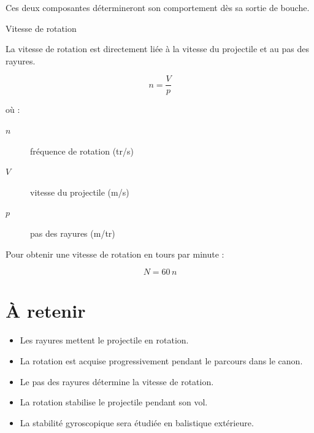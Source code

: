 Ces deux composantes détermineront son comportement dès sa sortie de bouche.

\begin{formule}{Vitesse de rotation}

La vitesse de rotation est directement liée à la vitesse du projectile et au
pas des rayures.

\[
n=\frac{V}{p}
\]

où :

\begin{description}
\item[$n$] fréquence de rotation (tr/s)
\item[$V$] vitesse du projectile (m/s)
\item[$p$] pas des rayures (m/tr)
\end{description}

Pour obtenir une vitesse de rotation en tours par minute :

\[
N=60\,n
\]

\end{formule}

\section{À retenir}

\begin{aretenir}

\begin{itemize}
    \item Les rayures mettent le projectile en rotation.
    \item La rotation est acquise progressivement pendant le parcours dans le
          canon.
    \item Le pas des rayures détermine la vitesse de rotation.
    \item La rotation stabilise le projectile pendant son vol.
    \item La stabilité gyroscopique sera étudiée en balistique extérieure.
\end{itemize}

\end{aretenir}
